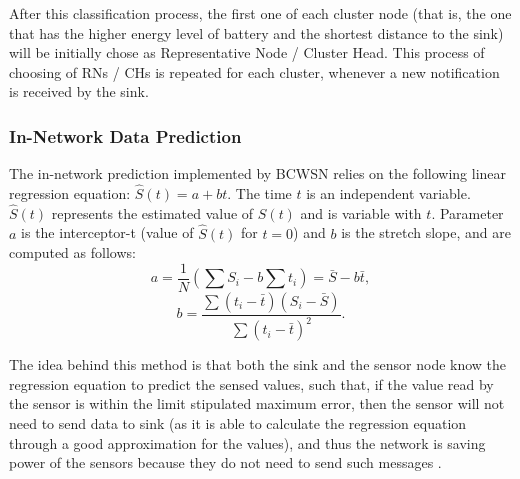 \documentclass[conference]{IEEEtran}
\begin{document}
After this classification process, the first one of each cluster node (that is,
the one that has the higher energy level of battery and the shortest distance to
the sink) will be initially chose as Representative Node / Cluster Head. This
process of choosing of RNs / CHs is repeated for each cluster, whenever a new
notification is received by the sink.


\subsubsection{In-Network Data Prediction}
\label{data-predict}

The in-network prediction implemented by BCWSN relies on the
following linear regression equation: $\hat{S}(t) = a + bt$.
The time $t$ is an independent variable. $\hat{S}(t)$ represents the estimated
value of $S(t)$ and is variable with $t$. Parameter $a$ is the interceptor-t
(value of $\hat{S}(t)$ for $t=0$) and $b$ is the stretch slope, and are computed
as follows:
\begin{equation}
	a = \frac{1}{N}\left(\sum S_{i} - b\sum t_{i} \right) = \bar{S} - b\bar{t},
\end{equation}
\vspace*{-.3cm}
\begin{equation}
	b = \frac{\sum \left(t_{i} - \bar{t}\right)\left(S_{i} - \bar{S}\right)}{\sum \left(t_{i} - \bar{t}\right)^{2}}.
\end{equation}

The idea behind this method is that both the sink and the sensor node know the
regression equation to predict the sensed values, such that, if the value read
by the sensor is within the limit stipulated maximum error, then the sensor will
not need to send data to sink (as it is able to calculate the regression
equation through a good approximation for the values), and thus the network is
saving power of the sensors because they do not need to send such messages \cite{MaiaACR2013}.
\end{document}
